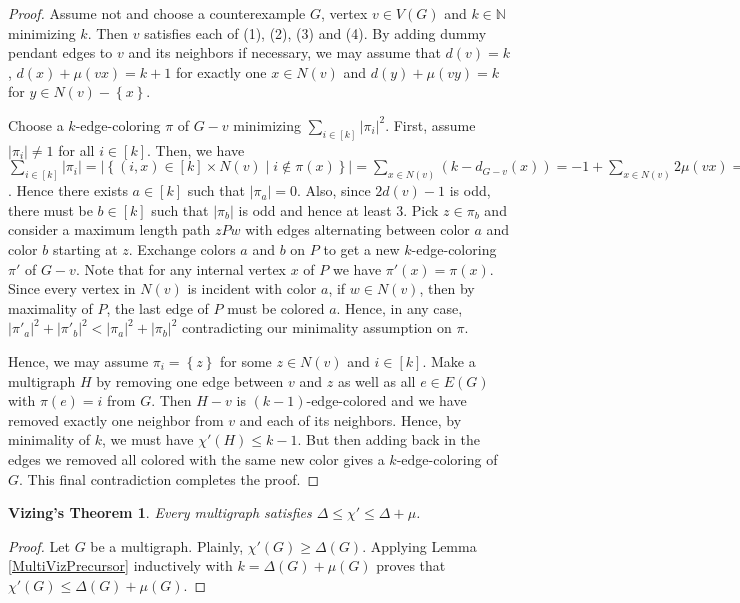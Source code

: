 \documentclass[12pt]{article}
\theoremstyle{plain}
\newtheorem*{Vizing}{Vizing's Theorem}
\theoremstyle{definition}
\theoremstyle{remark}
\newcommand{\set}[1]{\left\{ #1 \right\}}
\newcommand{\setb}[3]{\left\{ #1 \in #2 \mid #3 \right\}}
\newcommand{\card}[1]{\left|#1\right|}
\newcommand{\irange}[1]{\left[#1\right]}
\begin{document}
\begin{proof}
Assume not and choose a counterexample $G$, vertex $v \in V(G)$ and $k \in \mathbb{N}$ minimizing $k$.  Then $v$ satisfies each of (1), (2), (3) and (4).  By adding dummy pendant edges to $v$ and its neighbors if necessary, we may assume that $d(v) = k$, $d(x) + \mu(vx) = k + 1$ for exactly one $x \in N(v)$ and $d(y) + \mu(vy) = k$ for $y \in N(v) - \set{x}$.

Choose a $k$-edge-coloring $\pi$ of $G - v$ minimizing $\sum_{i \in \irange{k}} \card{\pi_i}^2$.  First, assume $\card{\pi_i} \neq 1$ for all $i \in \irange{k}$.  Then, we have $\sum_{i \in \irange{k}} \card{\pi_i} = \card{\setb{(i, x)}{\irange{k} \times N(v)}{i \not \in \pi(x)}} = \sum_{x \in N(v)} \left(k - d_{G-v}(x)\right) = -1 + \sum_{x \in N(v)} 2\mu(vx) = 2d(v) - 1 < 2k$.  Hence there exists $a \in \irange{k}$ such that $\card{\pi_a} = 0$.  Also, since $2d(v) - 1$ is odd, there must be $b \in \irange{k}$ such that $\card{\pi_b}$ is odd and hence at least $3$.  Pick $z \in \pi_b$ and consider a maximum length path $zPw$ with edges alternating between color $a$ and color $b$ starting at $z$.  Exchange colors $a$ and $b$ on $P$ to get a new $k$-edge-coloring $\pi'$ of $G-v$.  Note that for any internal vertex $x$ of $P$ we have $\pi'(x) = \pi(x)$.  Since every vertex in $N(v)$ is incident with color $a$, if $w \in N(v)$, then by maximality of $P$, the last edge of $P$ must be colored $a$.  Hence, in any case, $\card{\pi'_a}^2 + \card{\pi'_b}^2 < \card{\pi_a}^2 + \card{\pi_b}^2$ contradicting our minimality assumption on $\pi$.

Hence, we may assume $\pi_i = \set{z}$ for some $z \in N(v)$ and $i \in \irange{k}$.  Make a multigraph $H$ by removing one edge between $v$ and $z$ as well as all $e \in E(G)$ with $\pi(e) = i$ from $G$.  Then $H-v$ is $(k-1)$-edge-colored and we have removed exactly one neighbor from $v$ and each of its neighbors.  Hence, by minimality of $k$, we must have $\chi'(H) \leq k - 1$.  But then adding back in the edges we removed all colored with the same new color gives a $k$-edge-coloring of $G$. This final contradiction completes the proof.
\end{proof}

\begin{Vizing}
Every multigraph satisfies $\Delta \leq \chi' \leq \Delta + \mu$.
\end{Vizing}
\begin{proof}
Let $G$ be a multigraph.  Plainly, $\chi'(G) \geq \Delta(G)$.  Applying Lemma \ref{MultiVizPrecursor} inductively with $k = \Delta(G) + \mu(G)$ proves that $\chi'(G) \leq \Delta(G) + \mu(G)$.
\end{proof}
\end{document}
